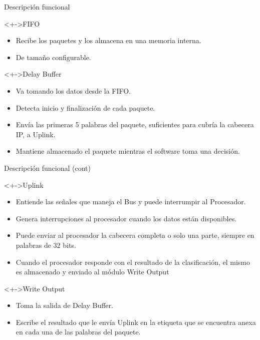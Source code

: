 \documentclass[xcolor=dvipsnames]{beamer}
\begin{document}
\begin{frame}{Descripción funcional}

\begin{block}<+->{FIFO}   
    \begin{itemize}
      \scriptsize
     	\item Recibe los paquetes y los almacena en una memoria interna.
	\item De tamaño configurable.
    \end{itemize}
  \end{block}
\begin{block}<+->{Delay Buffer}   
    \begin{itemize}
      \scriptsize
     	\item Va tomando los datos desde la FIFO.
	\item Detecta inicio y finalización de cada paquete.
	\item Envía las primeras 5 palabras del paquete, suficientes para cubría la cabecera IP, a Uplink.
	\item Mantiene almacenado el paquete mientras el software toma una decisión.
    \end{itemize}
  \end{block}
\end{frame}
\begin{frame}{Descripción funcional (cont)}
  \begin{block}<+->{Uplink}   
    \begin{itemize}
      \scriptsize
     	\item Entiende las señales que maneja el Bus y puede interrumpir al Procesador.
	\item Genera interrupciones al procesador cuando los datos están disponibles.
	\item Puede enviar al procesador la cabecera completa o solo una parte, siempre en palabras de 32 bits.
	\item Cuando el procesador responde con el resultado de la clasificación, el mismo es almacenado y enviado al módulo Write Output
    \end{itemize}
  \end{block}
\begin{block}<+->{Write Output}   
    \begin{itemize}
      \scriptsize
     	\item Toma la salida de Delay Buffer.
	\item Escribe el resultado que le envía Uplink en la etiqueta que se encuentra anexa en cada una de las palabras del paquete.
    \end{itemize}
  \end{block}
\end{frame}
\end{document}
